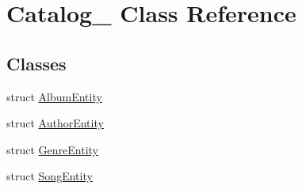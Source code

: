 \hypertarget{class_catalog__}{}\section{Catalog\+\_\+ Class Reference}
\label{class_catalog__}
\subsection*{Classes}
\begin{DoxyCompactItemize}
\item 
struct \hyperlink{struct_catalog___1_1_album_entity}{Album\+Entity}
\item 
struct \hyperlink{struct_catalog___1_1_author_entity}{Author\+Entity}
\item 
struct \hyperlink{struct_catalog___1_1_genre_entity}{Genre\+Entity}
\item 
struct \hyperlink{struct_catalog___1_1_song_entity}{Song\+Entity}
\end{DoxyCompactItemize}
